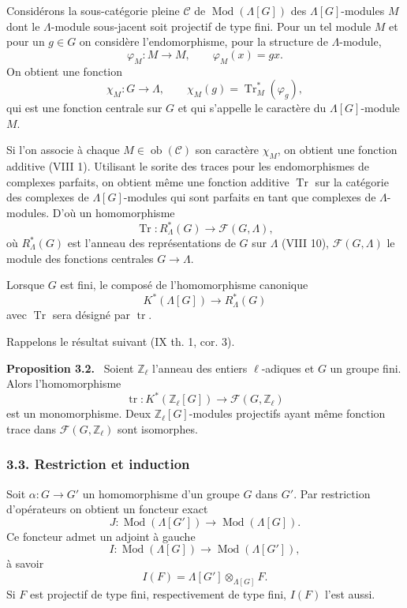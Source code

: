 \documentclass[11pt]{article}
\newenvironment{statement}[1]{\par\medskip\noindent\textbf{#1.}\ }{\par\medskip}
\providecommand{\Tr}{\operatorname{Tr}}
\providecommand{\Tr}{\operatorname{Tr}}
\providecommand{\Ob}{\operatorname{ob}}
\providecommand{\Tr}{\operatorname{Tr}}
\providecommand{\Ob}{\operatorname{ob}}
\providecommand{\Tr}{\operatorname{Tr}}
\providecommand{\Ob}{\operatorname{Ob}}
\providecommand{\Mod}{\operatorname{Mod}}
\providecommand{\tr}{\operatorname{tr}}
\providecommand{\Tr}{\operatorname{Tr}}
\providecommand{\Ob}{\operatorname{ob}}
\providecommand{\Ob}{\operatorname{Ob}}
\begin{document}
Considérons la sous-catégorie pleine $\mathcal C$ de $\Mod(\Lambda[G])$ des $\Lambda[G]$-modules $M$ dont le $\Lambda$-module sous-jacent soit projectif de type fini. Pour un tel module $M$ et pour un $g\in G$ on considère l'endomorphisme, pour la structure de $\Lambda$-module,
\[
\varphi_M:M\longrightarrow M,
\qquad \varphi_M(x)=gx.
\]
On obtient une fonction
\[
\chi_M:G\longrightarrow \Lambda,
\qquad \chi_M(g)=\Tr^*_M(\varphi_g),
\]
qui est une fonction centrale sur $G$ et qui s'appelle le caractère du $\Lambda[G]$-module $M$.

Si l'on associe à chaque $M\in\Ob(\mathcal C)$ son caractère $\chi_M$, on obtient une fonction additive (VIII 1). Utilisant le sorite des traces pour les endomorphismes de complexes parfaits, on obtient même une fonction additive $\Tr$ sur la catégorie des complexes de $\Lambda[G]$-modules qui sont parfaits en tant que complexes de $\Lambda$-modules. D'où un homomorphisme
\[
\Tr:R^*_{\Lambda}(G)\longrightarrow \mathcal F(G,\Lambda),
\]
où $R^*_{\Lambda}(G)$ est l'anneau des représentations de $G$ sur $\Lambda$ (VIII 10), $\mathcal F(G,\Lambda)$ le module des fonctions centrales $G\to\Lambda$.

Lorsque $G$ est fini, le composé de l'homomorphisme canonique
\[
K^*(\Lambda[G])\longrightarrow R^*_{\Lambda}(G)
\]
avec $\Tr$ sera désigné par $\tr$.

Rappelons le résultat suivant (IX th. 1, cor. 3).

\begin{statement}{Proposition 3.2}
Soient $\mathbb Z_\ell$ l'anneau des entiers $\ell$-adiques et $G$ un groupe fini. Alors l'homomorphisme
\[
\tr:K^*(\mathbb Z_\ell[G])\longrightarrow \mathcal F(G,\mathbb Z_\ell)
\]
est un monomorphisme. Deux $\mathbb Z_\ell[G]$-modules projectifs ayant même fonction trace dans $\mathcal F(G,\mathbb Z_\ell)$ sont isomorphes.
\end{statement}

\subsubsection*{3.3. Restriction et induction}

Soit $\alpha:G\to G'$ un homomorphisme d'un groupe $G$ dans $G'$. Par restriction d'opérateurs on obtient un foncteur exact
\[
J:\Mod(\Lambda[G'])\longrightarrow\Mod(\Lambda[G]).
\]
Ce foncteur admet un adjoint à gauche
\[
I:\Mod(\Lambda[G])\longrightarrow\Mod(\Lambda[G']),
\]
à savoir
\[
I(F)=\Lambda[G']\otimes_{\Lambda[G]}F.
\]
Si $F$ est projectif de type fini, respectivement de type fini, $I(F)$ l'est aussi.
\end{document}
